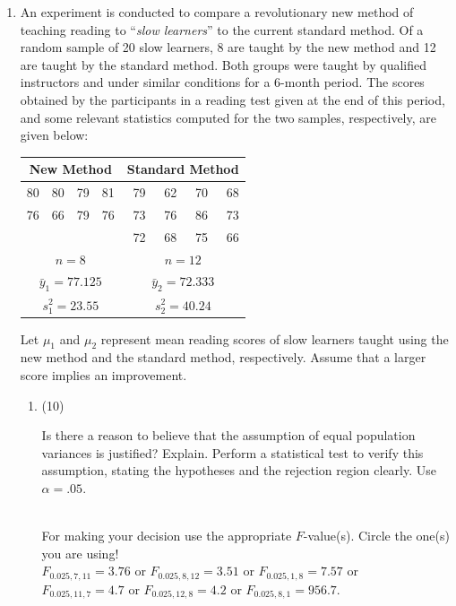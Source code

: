 \documentclass[12pt]{article}
\begin{document}
\begin{enumerate}
\item An experiment is conducted to compare a revolutionary
    new method of teaching reading to ``\textit{slow
    learners}'' to the current standard method.  Of a random
    sample of 20 slow learners, 8 are taught by the new
    method and 12 are taught by the standard method.  Both
    groups were taught by qualified instructors and under similar
    conditions for a 6-month period.  The scores obtained by the 
participants in a reading test given at the end of this period, and 
some relevant statistics computed for the two samples,
respectively,  are given below:\\

\vspace*{-.3in}

    \begin{center}
    \begin{tabular}{rrrr|rrrr} \\ \hline
    \multicolumn{4}{c}{New Method} & \multicolumn{4}{c}{Standard Method} \\ \hline
    80 & 80 & 79 & 81 &  79 & 62 & 70 & 68 \\
    76 & 66 & 79 & 76 &  73 & 76 & 86  & 73 \\ 
       &    &    &    &  72 & 68 & 75 & 66 \\ \hline
     \multicolumn{4}{c}{$n = 8$} & \multicolumn{4}{|c}{$n = 12$} \\ 
        \multicolumn{4}{c}{$\bar{y}_1=77.125$} & \multicolumn{4}{|c}{$\bar{y}_2=72.333$}\\
     \multicolumn{4}{c}{$s_1^2=23.55$} & \multicolumn{4}{|c}{$s_2^2=40.24$} \\  \hline
    \end{tabular}
    \end{center}
 Let $\mu_1$ and $\mu_2$ represent
mean reading scores of slow learners taught using the new method 
and the standard method, respectively. Assume that a larger score 
implies an improvement.
  \begin{enumerate}
  \item (10) \parbox[t]{6in}{Is there a reason to believe that
the assumption of equal population variances is justified? Explain.  
Perform a statistical test to verify this assumption, stating the hypotheses and
the rejection region clearly. Use
$\alpha=.05$.}\\
For making your decision use the appropriate $F$-value(s). Circle the one(s) you are using!\\
$F_{0.025,7,11}=3.76$ or $F_{0.025,8,12}=3.51$ or $F_{0.025,1,8}=7.57$ or \\
$F_{0.025,11,7}=4.7$ or $F_{0.025,12,8}=4.2$ or $F_{0.025,8,1}=956.7$.  
  

\end{enumerate}
\end{enumerate}
\end{document}

